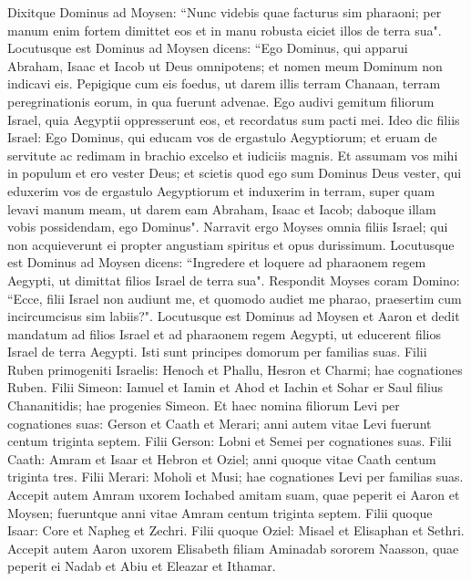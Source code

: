 \begin{biblechapter}  
\verse Dixitque Dominus ad Moysen: “Nunc videbis quae facturus sim pharaoni; per manum enim fortem dimittet eos et in manu robusta eiciet illos de terra sua". 
\verse Locutusque est Dominus ad Moysen dicens: “Ego Dominus, 
\verse qui apparui Abraham, Isaac et Iacob ut Deus omnipotens; et nomen meum Dominum non indicavi eis. 
\verse Pepigique cum eis foedus, ut darem illis terram Chanaan, terram peregrinationis eorum, in qua fuerunt advenae. 
\verse Ego audivi gemitum filiorum Israel, quia Aegyptii oppresserunt eos, et recordatus sum pacti mei. 
\verse Ideo dic filiis Israel: Ego Dominus, qui educam vos de ergastulo Aegyptiorum; et eruam de servitute ac redimam in brachio excelso et iudiciis magnis. 
\verse Et assumam vos mihi in populum et ero vester Deus; et scietis quod ego sum Dominus Deus vester, qui eduxerim vos de ergastulo Aegyptiorum 
\verse et induxerim in terram, super quam levavi manum meam, ut darem eam Abraham, Isaac et Iacob; daboque illam vobis possidendam, ego Dominus". 
\verse Narravit ergo Moyses omnia filiis Israel; qui non acquieverunt ei propter angustiam spiritus et opus durissimum. 
\verse Locutusque est Dominus ad Moysen dicens: 
\verse “Ingredere et loquere ad pharaonem regem Aegypti, ut dimittat filios Israel de terra sua". 
\verse Respondit Moyses coram Domino: “Ecce, filii Israel non audiunt me, et quomodo audiet me pharao, praesertim cum incircumcisus sim labiis?". 
\verse Locutusque est Dominus ad Moysen et Aaron et dedit mandatum ad filios Israel et ad pharaonem regem Aegypti, ut educerent filios Israel de terra Aegypti. 
\verse Isti sunt principes domorum per familias suas. Filii Ruben primogeniti Israelis: Henoch et Phallu, Hesron et Charmi; hae cognationes Ruben. 
\verse Filii Simeon: Iamuel et Iamin et Ahod et Iachin et Sohar er Saul filius Chananitidis; hae progenies Simeon. 
\verse Et haec nomina filiorum Levi per cognationes suas: Gerson et Caath et Merari; anni autem vitae Levi fuerunt centum triginta septem. 
\verse Filii Gerson: Lobni et Semei per cognationes suas. 
\verse Filii Caath: Amram et Isaar et Hebron et Oziel; anni quoque vitae Caath centum triginta tres. 
\verse Filii Merari: Moholi et Musi; hae cognationes Levi per familias suas. 
\verse Accepit autem Amram uxorem Iochabed amitam suam, quae peperit ei Aaron et Moysen; fueruntque anni vitae Amram centum triginta septem. 
\verse Filii quoque Isaar: Core et Napheg et Zechri. 
\verse Filii quoque Oziel: Misael et Elisaphan et Sethri. 
\verse Accepit autem Aaron uxorem Elisabeth filiam Aminadab sororem Naasson, quae peperit ei Nadab et Abiu et Eleazar et Ithamar. 

\end{biblechapter}
